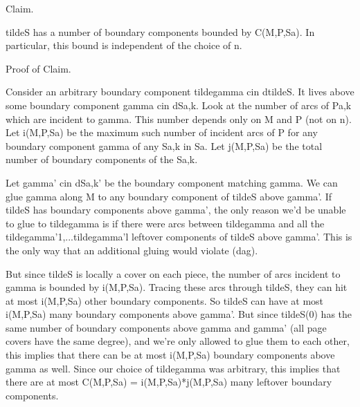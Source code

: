\documentclass[12pt]{amsart}
\theoremstyle{definition}
\theoremstyle{remark}
\begin{document}
Claim.

tildeS has a number of boundary components bounded by C(M,P,Sa). In particular,
this bound is independent of the choice of n.

Proof of Claim.

Consider an arbitrary boundary component tildegamma cin dtildeS.  It lives
above some boundary component gamma cin dSa,k. Look at the number of arcs of
Pa,k which are incident to gamma. This number depends only on M and P (not on
n). Let i(M,P,Sa) be the maximum such number of incident arcs of P for any
boundary component gamma of any Sa,k in Sa. Let j(M,P,Sa) be the total number
of boundary components of the Sa,k.

Let gamma' cin dSa,k' be the boundary component matching gamma. We can glue
gamma along M to any boundary component of tildeS above gamma'. If tildeS has
boundary components above gamma', the only reason we'd be unable to glue to
tildegamma is if there were arcs between tildegamma and all the
tildegamma'1,...tildegamma'l leftover components of tildeS above gamma'.  This
is the only way that an additional gluing would violate (dag).

But since tildeS is locally a cover on each piece, the number of arcs incident
to gamma is bounded by i(M,P,Sa). Tracing these arcs through tildeS, they can
hit at most i(M,P,Sa) other boundary components. So tildeS can have at most
i(M,P,Sa) many boundary components above gamma'. But since tildeS(0) has the
same number of boundary components above gamma and gamma' (all page covers have
the same degree), and we're only allowed to glue them to each other, this
implies that there can be at most i(M,P,Sa) boundary components above gamma as
well. Since our choice of tildegamma was arbitrary, this implies that there are
at most C(M,P,Sa) = i(M,P,Sa)*j(M,P,Sa) many leftover boundary components.


\end{document}
